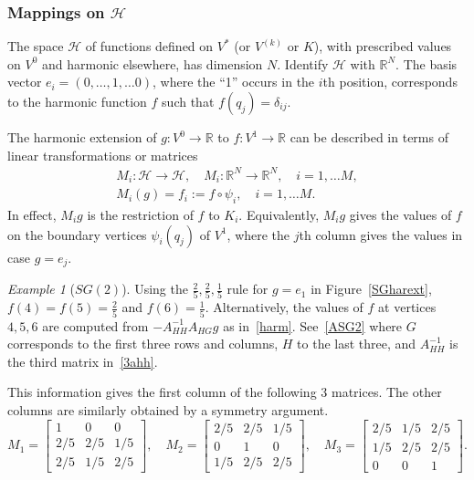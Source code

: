 \documentclass[a4paper]{amsart}
\theoremstyle{plain}
\theoremstyle{definition}
\theoremstyle{remark}
\newtheorem{example}[theorem]{Example}
\begin{document}
\subsubsection{Mappings on $ \mathcal{H} $}
The  space $ \mathcal{H} $ of functions defined on    $ V^* $ (or $ V^{(k)} $ or $ K $), with prescribed values on $ V^{0} $ and harmonic   elsewhere, has dimension $ N $.   Identify $ \mathcal{H} $ with $ \mathbb{R} ^N $.  The basis vector  $ e_i = (0,\dots, 1, \dots 0 )$, where the ``1'' occurs in the $ i $th position, corresponds to the harmonic function $ f $ such that $ f(q_j) = \delta _{ij} $. 



\medskip The harmonic extension of $ g : V^{0} \to \mathbb{R}$ to $ f:V^{1}\to \mathbb{R} $
can be described in terms of linear transformations or matrices
\begin{equation} \label{} 
\begin{gathered}
M_i:\mathcal{H} \to \mathcal{H},\quad   M_i :\mathbb{R} ^N \to \mathbb{R} ^N, \quad i=1,\dots M, \\
M_i(g) = f_i := f \circ \psi_i,  \quad i=1,\dots M.
\end{gathered}
\end{equation} 
In effect, $ M_i g $ is the restriction of $ f $ to $ K_i $.  Equivalently,  $ M_i g $ gives the values of $ f$ on the boundary vertices $ \psi_i(q_j) $ of $ V^{1}  $, where the $ j $th column gives the values in case $ g = e_j $. 

\begin{example}[$ SG(2) $]  Using the $ \frac{2}{5},  \frac{2}{5}, \frac{ 1}{5} $ rule for $ g = e_1 $  in Figure~\ref{SGharext}, $ f(4) = f(5) = \frac{2}{5} $ and $ f(6) = \frac{1}{5} $.  Alternatively, the values of $ f $ at vertices $ 4,5,6 $ are computed from $ -A_{HH}^{-1}A_{HG}g $ as in~\eqref{harm}.  See~\eqref{ASG2} where $ G $ corresponds to the first three rows and columns, $ H $ to the last three, and $ A_{HH}^{-1} $ is the third matrix in~\eqref{3ahh}. 

This information gives the first column of the following 3 matrices.  The other columns are similarly obtained by a symmetry argument.
\begin{equation} \label{}
M_1 = \begin{bmatrix}  1&0&0 \\ 2/5 & 2/5&1/5 \\ 2/5 & 1/5 & 2/5 \end{bmatrix}, \quad 
M_2 = \begin{bmatrix}  2/5 & 2/5&1/5 \\ 0 & 1 & 0 \\ 1/5 & 2/5 & 2/5 \end{bmatrix}, \quad 
M_3 = \begin{bmatrix}  2/5 & 1/5&2/5 \\ 1/5 & 2/5 & 2/5\\ 0 & 0 & 1 \end{bmatrix}. 
\end{equation} 
 \end{example} 
 
\end{document}
